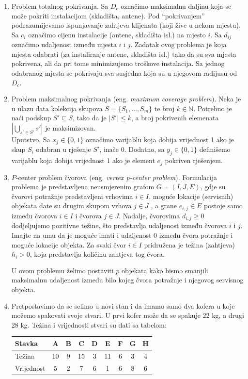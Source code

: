 \documentclass[a4paper, utf8, 11pt, colorlinks]{book}
\begin{document}
\begin{enumerate}
	
	\item Problem totalnog pokrivanja. %
	Sa $D_c$ označimo maksimalnu daljinu koja se može pokriti instalacijom (skladišta, antene). Pod ``pokrivanjem'' podrazumijevamo ispunjavanje zahtjeva klijenata (koji žive u nekom mjestu). Sa $c_i$ označimo cijenu instalacije (antene, skladišta isl.) na mjesto $i$. Sa $d_{ij}$ označimo udaljenost između mjesta $i$ i $j$. Zadatak ovog problema je koja mjesta odabrati (za instaliranje antene, skladišta isl.) tako da su sva mjesta pokrivena, ali da pri tome minimizujemo troškove instalacija. Sa jednog odabranog mjesta se pokrivaju sva susjedna koja su u njegovom radijusu od $D_c$. 
	\item Problem maksimalnog pokrivanja (eng. \emph{maximum coverage problem}). Neka je u ulazu data kolekcija skupova  $S=\{ S_1, \ldots, S_m\}$ te broj $k \in \mathbb{N}$. Potrebno je naći podskup $S' \subseteq S$, tako da je $|S'|\leq k$, a broj pokrivenih elemenata $|\bigcup_{s' \in S'} s'|$ je maksimizovan. \\
	Uputstvo. Sa $x_j \in \{0, 1\}$ označimo varijablu koja dobija vrijednost 1 ako je skup $S_i$ odabran u rješenje $S'$, inače 0. Dodatno, sa $y_j \in \{0, 1 \}$ definišemo varijablu koja dobija vrijednost 1 ako je   element $e_j$ pokriven rješenjem.  
	\item $P$-center problem čvorova (eng. \emph{vertex p-center problem}). Formulacija problema je  predstavljena neusmjerenim grafom $G = (I, J, E)$, gdje su čvorovi potražnje predstavljeni  vrhovima $i\in I$, moguće lokacije (servisnih) objekata date su drugim skupom vrhova $j \in J$ , a grane $e_{i,j} \in E$ postoje samo između čvorova $i \in  I$ i čvorova $j \in J$. Nadalje, čvorovima $d_{i,j}\geq 0$ dodjeljujemo pozitivne težine, što predstavlja udaljenost između čvorova $i$ i $j$. Imajte na umu da je moguće imati i udaljenost 0 između čvora potražnje i moguće lokacije objekta. Za svaki čvor $i \in I$ pridružena je težina (zahtjeva) $h_i>0$, koja predstavlja količinu zahtjeva tog čvora. 
	
	U ovom problemu želimo postaviti $p$ objekata kako bismo smanjili maksimalnu udaljenost između bilo kojeg čvora potražnje i	njegovog servisnog objekta. 
	\item %
	 Pretpostavimo da se selimo u novi stan i da imamo samo dva kofera u koje možemo spakovati svoje stvari. U prvi kofer može da se spakuje 22 kg, a drugi 28 kg. Težina i vrijednosti stvari
	su dati sa tabelom:
 \begin{table}[H]
 	\centering
	\begin{tabular}{l|cccccccc}
		Stavka & A & B & C & D & E & F & G & H \\ \hline
		Težina & 10 & 9 & 15 & 3 & 11 & 6 & 3 & 4 \\
		Vrijednost & 5 & 2 & 7 & 6 & 1 & 6 & 8 & 6 \\ \hline
	\end{tabular} 
    

\end{table}
\end{enumerate}
\end{document}
